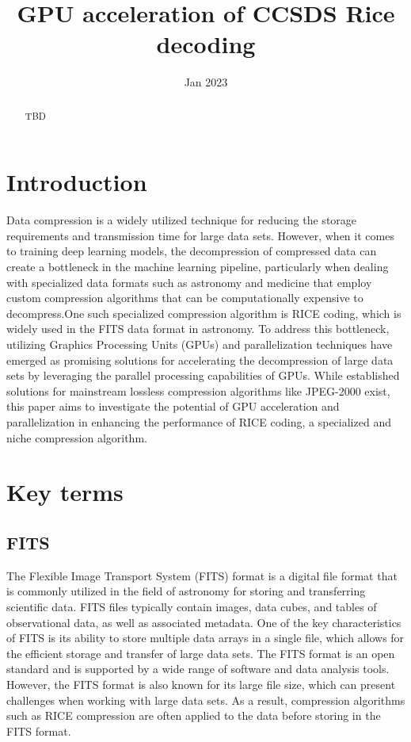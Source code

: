 \documentclass[licencjacka,en]{pracamgr}
\title{GPU acceleration of CCSDS Rice decoding}
\date{Jan 2023}
\begin{document}
\maketitle

\begin{abstract}
	TBD
\end{abstract}

\tableofcontents

\chapter*{Introduction}
Data compression is a widely utilized technique for reducing the storage requirements and
transmission time for large data sets. However, when it comes to training deep learning models,
the decompression of compressed data can create a bottleneck in the machine learning pipeline, particularly
when dealing with specialized data formats such as astronomy and medicine that employ custom compression
algorithms that can be computationally expensive to decompress.One such specialized compression algorithm is RICE coding,
which is widely used in the FITS data format in astronomy. To address this bottleneck,
utilizing Graphics Processing Units (GPUs) and parallelization techniques have emerged as promising solutions
for accelerating the decompression of large data sets by leveraging the parallel processing capabilities of GPUs.
While established solutions for mainstream lossless compression algorithms like JPEG-2000 exist,
this paper aims to investigate the potential of GPU acceleration and parallelization
in enhancing the performance of RICE coding, a specialized and niche compression algorithm.


\chapter{Key terms}\label{r:pojecia}

\section{FITS}
The Flexible Image Transport System (FITS) format is a digital file format that is commonly
utilized in the field of astronomy for storing and transferring scientific data. FITS files
typically contain images, data cubes, and tables of observational data, as well as associated metadata.
One of the key characteristics of FITS is its ability to store multiple data arrays in a single file, which
allows for the efficient storage and transfer of large data sets. The FITS format is an open standard
and is supported by a wide range of software and data analysis tools. However, the FITS format is also
known for its large file size, which can present challenges when working with large data sets.
As a result, compression algorithms such as RICE compression are often applied to the data before storing in the FITS format. \\
\end{document}

